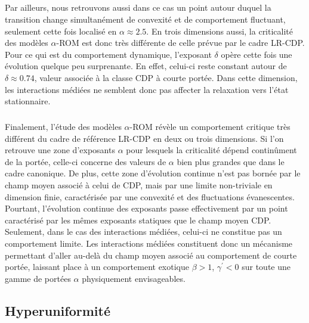 \subparagraph{}Par ailleurs, nous retrouvons aussi dans ce cas un point autour duquel la transition change simultanément de convexité et de comportement fluctuant, seulement cette fois localisé en $\alpha\approx 2.5$. En trois dimensions aussi, la criticalité des modèles $\alpha$-ROM est donc très différente de celle prévue par le cadre LR-CDP. Pour ce qui est du comportement dynamique, l'exposant $\delta$ opère cette fois une évolution quelque peu surprenante. En effet, celui-ci reste constant autour de $\delta \approx 0.74$, valeur associée à la classe CDP à courte portée. Dans cette dimension, les interactions médiées ne semblent donc pas affecter la relaxation vers l'état stationnaire.

\subparagraph{}Finalement, l'étude des modèles $\alpha$-ROM révèle un comportement critique très différent du cadre de référence LR-CDP en deux ou trois dimensions. Si l'on retrouve une zone d'exposants $\alpha$ pour lesquels la criticalité dépend continûment de la portée, celle-ci concerne des valeurs de $\alpha$ bien plus grandes que dans le cadre canonique. De plus, cette zone d'évolution continue n'est pas bornée par le champ moyen associé à celui de CDP, mais par une limite non-triviale en dimension finie, caractérisée par une convexité et des fluctuations évanescentes. Pourtant, l'évolution continue des exposants passe effectivement par un point caractérisé par les mêmes exposants statiques que le champ moyen CDP. Seulement, dans le cas des interactions médiées, celui-ci ne constitue pas un comportement limite. Les interactions médiées constituent donc un mécanisme permettant d'aller au-delà du champ moyen associé au comportement de courte portée, laissant place à un comportement exotique $\beta >1$, $\gamma^\prime<0$ sur toute une gamme de portées $\alpha$ physiquement envisageables.

\subsection{Hyperuniformité}

\label{sec:TBLRRHU}

